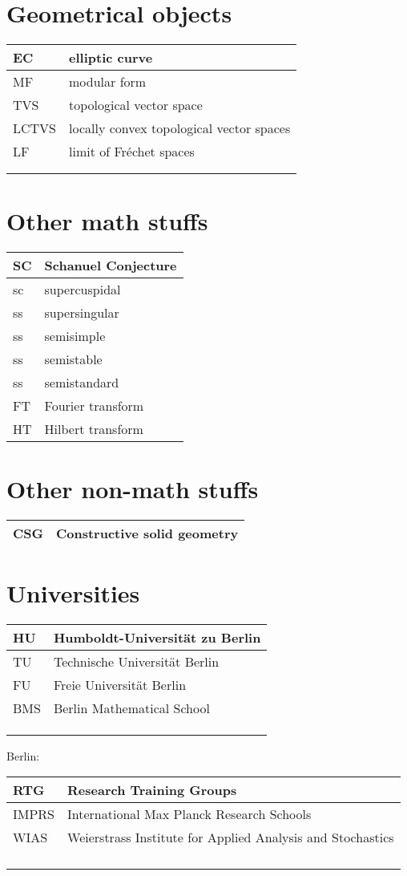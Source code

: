 \documentclass{amsart}
\numberwithin{equation}{section}
\theoremstyle{plain}
\numberwithin{equation}{section}
\theoremstyle{remark}
\begin{document}
\section{Geometrical objects}
\begin{longtable}{l|l}
\hline
EC & elliptic curve \\ \hline
MF & modular form  \\ \hline
TVS & topological vector space\\ \hline
LCTVS &  locally convex topological vector spaces\\ \hline
LF & limit of Fréchet spaces\\ \hline
 & \\ \hline
 & \\ \hline
\end{longtable}

\section{Other math stuffs}
\begin{longtable}{l|l}
\hline
SC & Schanuel Conjecture \\ \hline
sc & supercuspidal\\ \hline
ss & supersingular\\ \hline
ss & semisimple\\ \hline
ss & semistable\\ \hline
ss & semistandard\\ \hline
FT & Fourier transform\\ \hline
HT & Hilbert transform\\ \hline
\end{longtable}

\section{Other non-math stuffs}
\begin{longtable}{l|l}
\hline
CSG & Constructive solid geometry\\ \hline
\end{longtable}


\section{Universities}
\begin{longtable}{l|l}
\hline
HU & Humboldt-Universität zu Berlin \\ \hline
TU & Technische Universität Berlin  \\ \hline
FU & Freie Universität Berlin\\ \hline
BMS & Berlin Mathematical School\\ \hline
 & \\ \hline
 & \\ \hline
 & \\ \hline
\end{longtable}

Berlin:
\begin{longtable}{l|l}
\hline
RTG & Research Training Groups \\ \hline
IMPRS & International Max Planck Research Schools  \\ \hline
WIAS & Weierstrass Institute for Applied Analysis and Stochastics\\ \hline
 & \\ \hline
 & \\ \hline
 & \\ \hline
 & \\ \hline
\end{longtable}
\end{document}
